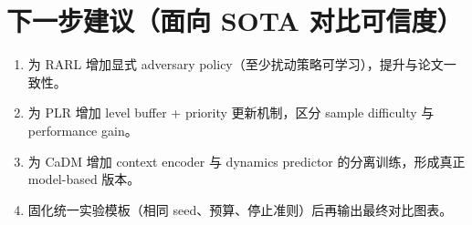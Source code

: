﻿\documentclass[12pt,a4paper]{ctexart}
\begin{document}
\section{下一步建议（面向 SOTA 对比可信度）}
\begin{enumerate}
  \item 为 RARL 增加显式 adversary policy（至少扰动策略可学习），提升与论文一致性。
  \item 为 PLR 增加 level buffer + priority 更新机制，区分 sample difficulty 与 performance gain。
  \item 为 CaDM 增加 context encoder 与 dynamics predictor 的分离训练，形成真正 model-based 版本。
  \item 固化统一实验模板（相同 seed、预算、停止准则）后再输出最终对比图表。
\end{enumerate}
\end{document}
